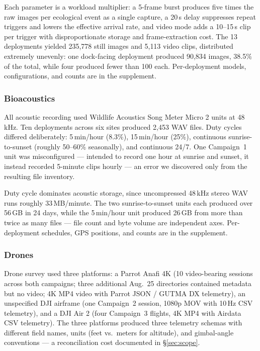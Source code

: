 \documentclass[sigconf]{acmart}
\begin{document}
Each parameter is a workload multiplier: a 5-frame burst produces five
times the raw images per ecological event as a single capture, a 20\,s
delay suppresses repeat triggers and lowers the effective arrival rate,
and video mode adds a 10--15\,s clip per trigger with disproportionate
storage and frame-extraction cost. The 13 deployments yielded
235{,}778 still images and 5{,}113 video clips, distributed extremely
unevenly: one dock-facing deployment produced 90{,}834 images, 38.5\% of
the total, while four produced fewer than 100 each. Per-deployment
models, configurations, and counts are in the supplement.



\subsubsection{Bioacoustics}
All acoustic recording used Wildlife Acoustics Song Meter Micro 2 units
at 48\,kHz. Ten deployments across six sites produced 2{,}453 WAV files.
Duty cycles differed deliberately: 5\,min/hour (8.3\%), 15\,min/hour
(25\%), continuous sunrise-to-sunset (roughly 50--60\% seasonally), and
continuous 24/7. One Campaign~1 unit was misconfigured --- intended to
record one hour at sunrise and sunset, it instead recorded 5-minute
clips hourly --- an error we discovered only from the resulting file
inventory.

Duty cycle dominates acoustic storage, since uncompressed 48\,kHz stereo
WAV runs roughly 33\,MB/minute. The two sunrise-to-sunset units each
produced over 56\,GB in 24 days, while the 5\,min/hour unit produced
26\,GB from more than twice as many files --- file count and byte volume
are independent axes. Per-deployment schedules, GPS positions, and
counts are in the supplement.



\subsubsection{Drones}
Drone survey used three platforms: a Parrot Anafi 4K (10 video-bearing
sessions across both campaigns; three additional Aug.~25 directories contained
metadata but no video; 4K MP4 video with Parrot JSON / GUTMA DX telemetry),
an unspecified DJI airframe (one Campaign~2 session,
1080p MOV with 10\,Hz CSV telemetry), and a DJI Air 2 (four Campaign~3
flights, 4K MP4 with Airdata CSV telemetry). The three platforms
produced three telemetry schemas with different field names, units
(feet vs.\ meters for altitude), and gimbal-angle conventions ---
a reconciliation cost documented in \S\ref{sec:scope}.
\end{document}
